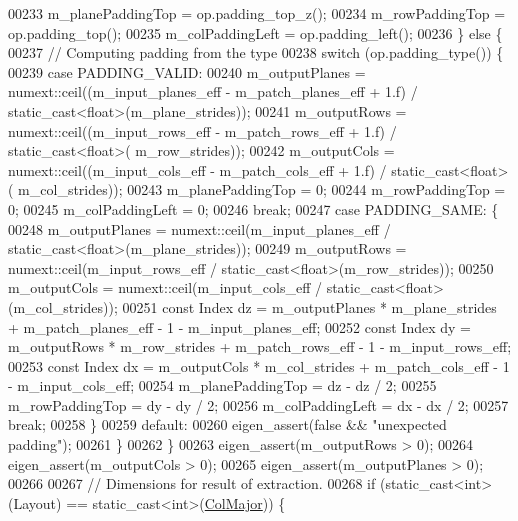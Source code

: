 \begin{DoxyCode}
00233       m\_planePaddingTop = op.padding\_top\_z();
00234       m\_rowPaddingTop = op.padding\_top();
00235       m\_colPaddingLeft = op.padding\_left();
00236     \} \textcolor{keywordflow}{else} \{
00237       \textcolor{comment}{// Computing padding from the type}
00238       \textcolor{keywordflow}{switch} (op.padding\_type()) \{
00239         \textcolor{keywordflow}{case} PADDING\_VALID:
00240           m\_outputPlanes = numext::ceil((m\_input\_planes\_eff - m\_patch\_planes\_eff + 1.f) / 
      static\_cast<float>(m\_plane\_strides));
00241           m\_outputRows = numext::ceil((m\_input\_rows\_eff - m\_patch\_rows\_eff + 1.f) / static\_cast<float>(
      m\_row\_strides));
00242           m\_outputCols = numext::ceil((m\_input\_cols\_eff - m\_patch\_cols\_eff + 1.f) / static\_cast<float>(
      m\_col\_strides));
00243           m\_planePaddingTop = 0;
00244           m\_rowPaddingTop = 0;
00245           m\_colPaddingLeft = 0;
00246           \textcolor{keywordflow}{break};
00247         \textcolor{keywordflow}{case} PADDING\_SAME: \{
00248           m\_outputPlanes = numext::ceil(m\_input\_planes\_eff / static\_cast<float>(m\_plane\_strides));
00249           m\_outputRows = numext::ceil(m\_input\_rows\_eff / static\_cast<float>(m\_row\_strides));
00250           m\_outputCols = numext::ceil(m\_input\_cols\_eff / static\_cast<float>(m\_col\_strides));
00251           \textcolor{keyword}{const} Index dz = m\_outputPlanes * m\_plane\_strides + m\_patch\_planes\_eff - 1 - m\_input\_planes\_eff;
00252           \textcolor{keyword}{const} Index dy = m\_outputRows * m\_row\_strides + m\_patch\_rows\_eff - 1 - m\_input\_rows\_eff;
00253           \textcolor{keyword}{const} Index dx = m\_outputCols * m\_col\_strides + m\_patch\_cols\_eff - 1 - m\_input\_cols\_eff;
00254           m\_planePaddingTop = dz - dz / 2;
00255           m\_rowPaddingTop = dy - dy / 2;
00256           m\_colPaddingLeft = dx - dx / 2;
00257           \textcolor{keywordflow}{break};
00258         \}
00259         \textcolor{keywordflow}{default}:
00260           eigen\_assert(\textcolor{keyword}{false} && \textcolor{stringliteral}{"unexpected padding"});
00261       \}
00262     \}
00263     eigen\_assert(m\_outputRows > 0);
00264     eigen\_assert(m\_outputCols > 0);
00265     eigen\_assert(m\_outputPlanes > 0);
00266 
00267     \textcolor{comment}{// Dimensions for result of extraction.}
00268     \textcolor{keywordflow}{if} (static\_cast<int>(Layout) == static\_cast<int>(\hyperlink{group__enums_ggaacded1a18ae58b0f554751f6cdf9eb13a0cbd4bdd0abcfc0224c5fcb5e4f6669a}{ColMajor})) \{

\end{DoxyCode}
